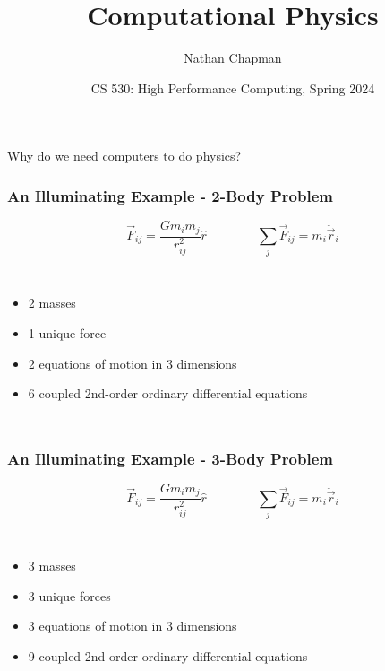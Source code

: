 \documentclass{beamer}
\title[Computational Physics]{Computational Physics}
\author[Chapman, Nathan]{Nathan Chapman}
\institute[CWU]
{
  Faculty of Physics\\
  Central Washington University
}
\date[HPC 2024]{CS 530: High Performance Computing, Spring 2024}
\begin{document}
\frame{\titlepage}

\begin{frame}

    \begin{block}{}
        \centering \Large Why do we need computers to do physics?
    \end{block}

\end{frame}

\begin{frame}
    \frametitle{An Illuminating Example - 2-Body Problem}
    \vspace{-0.75in}
    \begin{equation*}
        \vec{F}_{ij} = \frac{G m_i m_j}{r_{ij}^2} \hat{r} \qquad \qquad \sum_j \vec{F}_{ij} = m_i \ddot{\vec{r}}_i
    \end{equation*}

    \begin{columns}
        \begin{itemize}
            \item 2 masses
            \item 1 unique force
            \item 2 equations of motion in 3 dimensions
            \item 6 coupled 2nd-order ordinary differential equations
        \end{itemize}

    \end{columns}
\end{frame}

\begin{frame}
    \frametitle{An Illuminating Example - 3-Body Problem}
    \vspace{-0.75in}
    \begin{equation*}
        \vec{F}_{ij} = \frac{G m_i m_j}{r_{ij}^2} \hat{r} \qquad \qquad \sum_j \vec{F}_{ij} = m_i \ddot{\vec{r}}_i 
    \end{equation*}

    \begin{columns}
        \begin{itemize}
            \item 3 masses
            \item 3 unique forces
            \item 3 equations of motion in 3 dimensions
            \item 9 coupled 2nd-order ordinary differential equations
        \end{itemize}

    \end{columns}
\end{frame}
\end{document}
